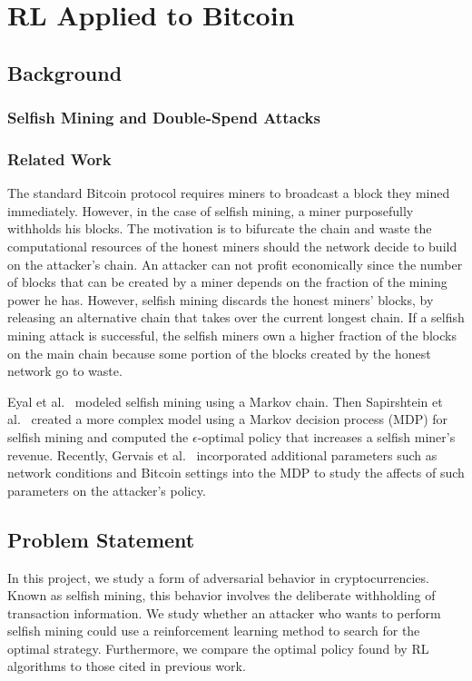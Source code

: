 \chapter{RL Applied to Bitcoin}\label{selfishRL}
\section{Background}
\subsection{Selfish Mining and Double-Spend Attacks}
\subsection{Related Work}
The standard Bitcoin protocol requires miners to broadcast a block they mined immediately. However, in the case of selfish mining, a miner purposefully withholds his blocks. The motivation is to bifurcate the chain and waste the computational resources of the honest miners should the network decide to build on the attacker's chain. An attacker can not profit economically since the number of blocks that can be created by a miner depends on the fraction of the mining power he has. However, selfish mining discards the honest miners' blocks, by releasing an alternative chain that takes over the current longest chain. If a selfish mining attack is successful, the selfish miners own a higher fraction of the blocks on the main chain because some portion of the blocks created by the honest network go to waste.

Eyal et al.~\cite{eyal:2014} modeled selfish mining using a Markov chain. Then Sapirshtein et al.~\cite{sapirshtein:2015} created a more complex model using a Markov decision process (MDP) for selfish mining and computed the $\epsilon$-optimal policy that increases a selfish miner's revenue. Recently, Gervais et al.~\cite{Gervais:2016} incorporated additional parameters such as network conditions and Bitcoin settings into the MDP to study the affects of such parameters on the attacker's policy. %
\section{Problem Statement}
In this project, we study a form of adversarial behavior in cryptocurrencies. Known as selfish mining, this behavior involves the deliberate withholding of transaction information. We study whether an attacker who wants to perform selfish mining could use a reinforcement learning method to search for the optimal strategy. Furthermore, we compare the optimal policy found by RL algorithms to those cited in previous work.


